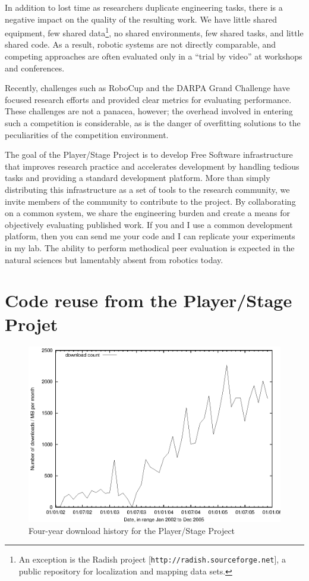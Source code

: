 In addition to lost time as researchers duplicate engineering tasks,
there is a negative impact on the quality of the resulting work.  We
have little shared equipment, few shared data\footnote{An exception is
the Radish project [{\tt http://radish.sourceforge.net}], a
public repository for localization and mapping data sets.}, no shared
environments, few shared tasks, and little shared code.  As a result,
robotic systems are not directly comparable, and competing approaches
are often evaluated only in a ``trial by video'' at workshops and
conferences.  

Recently, challenges such as RoboCup and the DARPA Grand Challenge
have focused research efforts and provided clear metrics for
evaluating performance.  These challenges are not a panacea, however;
the overhead involved in entering such a competition is considerable,
as is the danger of overfitting solutions to the peculiarities of the
competition environment.

The goal of the Player/Stage Project is to develop Free Software
infrastructure that improves research practice and accelerates
development by handling tedious tasks and providing a standard
development platform.  More than simply distributing this
infrastructure as a set of tools to the research community, we invite
members of the community to contribute to the project.  By
collaborating on a common system, we share the engineering burden and
create a means for objectively evaluating published work.  If you and
I use a common development platform, then you can send me your code
and I can replicate your experiments in my lab.  The ability to
perform methodical peer evaluation is expected in the natural sciences
but lamentably absent from robotics today.

\section{Code reuse from the Player/Stage Projet}

\begin{figure}[top]
\begin{center}
\includegraphics[width=\columnwidth]{ps_stats}
\caption{\label{32:fig-ps_downloads}Four-year download history for the Player/Stage Project}
\end{center}
\end{figure}

